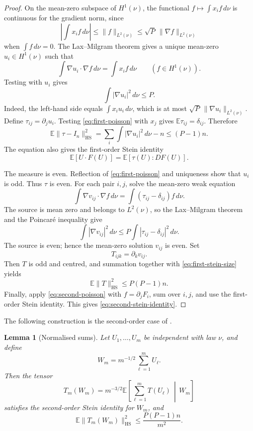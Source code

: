 \documentclass[11pt]{amsart}
\numberwithin{equation}{section}
\newtheorem{lemma}[theorem]{Lemma}
\theoremstyle{definition}
\theoremstyle{remark}
\newcommand{\E}{\mathbb E}
\newcommand{\Id}{I_n}
\newcommand{\HS}{\mathrm{HS}}
\newcommand{\norm}[1]{\lVert #1\rVert}
\begin{document}
\begin{proof}
On the mean-zero subspace of \(H^1(\nu)\), the functional
\(f\mapsto\int x_i f\,d\nu\) is continuous for the gradient norm, since
\[
\left|\int x_i f\,d\nu\right|
\le \norm{f}_{L^2(\nu)}
\le\sqrt P\,\norm{\nabla f}_{L^2(\nu)}
\]
when \(\int f\,d\nu=0\). The Lax--Milgram theorem gives a unique
mean-zero \(u_i\in H^1(\nu)\) such that
\begin{equation}\label{eq:first-poisson}
\int\nabla u_i\cdot\nabla f\,d\nu=\int x_i f\,d\nu
\qquad(f\in H^1(\nu)).
\end{equation}
Testing with \(u_i\) gives
\[
\int|\nabla u_i|^2\,d\nu\le P.
\]
Indeed, the left-hand side equals \(\int x_i u_i\,d\nu\), which is at
most \(\sqrt P\,\|\nabla u_i\|_{L^2(\nu)}\).
Define \(\tau_{ij}=\partial_j u_i\). Testing
\eqref{eq:first-poisson} with \(x_j\) gives
\(\E\tau_{ij}=\delta_{ij}\). Therefore
\begin{equation}\label{eq:first-stein-size}
\E\norm{\tau-\Id}_{\HS}^2
=\sum_i\int|\nabla u_i|^2\,d\nu-n
\le(P-1)n.
\end{equation}
The equation also gives the first-order Stein identity
\[
\E[U\cdot F(U)]=\E[\tau(U):DF(U)].
\]

The measure is even. Reflection of
\eqref{eq:first-poisson} and uniqueness show that \(u_i\) is odd.
Thus \(\tau\) is even. For each pair \(i,j\), solve the mean-zero weak
equation
\begin{equation}\label{eq:second-poisson}
\int\nabla v_{ij}\cdot\nabla f\,d\nu
=\int(\tau_{ij}-\delta_{ij})f\,d\nu.
\end{equation}
The source is mean zero and belongs to \(L^2(\nu)\), so
the Lax--Milgram theorem and the Poincar\'e inequality give
\[
\int|\nabla v_{ij}|^2\,d\nu
\le P\int|\tau_{ij}-\delta_{ij}|^2\,d\nu.
\]
The source is even; hence the mean-zero solution \(v_{ij}\) is even.
Set
\[
T_{ijk}=\partial_k v_{ij}.
\]
Then \(T\) is odd and centred, and summation together with
\eqref{eq:first-stein-size} yields
\[
\E\norm T_{\HS}^2\le P(P-1)n.
\]
Finally, apply \eqref{eq:second-poisson} with
\(f=\partial_j F_i\), sum over \(i,j\), and use the first-order
Stein identity. This gives \eqref{eq:second-stein-identity}.
\end{proof}

The following construction is the second-order case of
\cite[Lemma~4.1 and Corollary~4.2]{Fathi21}.

\begin{lemma}[Normalised sums]\label{lem:stein-sums}
Let \(U_1,\ldots,U_m\) be independent with law \(\nu\), and define
\[
W_m=m^{-1/2}\sum_{\ell=1}^m U_\ell.
\]
Then the tensor
\begin{equation}\label{eq:sum-tensor}
T_m(W_m)=m^{-3/2}
\E\left[\sum_{\ell=1}^m T(U_\ell)\,\middle|\,W_m\right]
\end{equation}
satisfies the second-order Stein identity for \(W_m\), and
\begin{equation}\label{eq:sum-tensor-bound}
\E\norm{T_m(W_m)}_{\HS}^2
\le\frac{P(P-1)n}{m^2}.
\end{equation}
\end{lemma}
\end{document}
